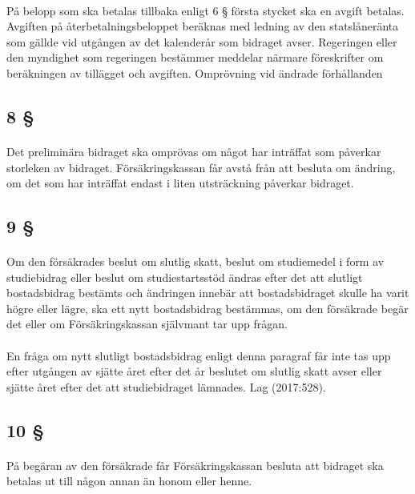 \documentclass[a4paper,notitlepage,openany,10pt]{book}
\begin{document}
\paragraph*{}
På belopp som ska betalas tillbaka enligt 6 § första stycket ska en avgift betalas. Avgiften på återbetalningsbeloppet beräknas med ledning av den statslåneränta som gällde vid utgången av det kalenderår som bidraget avser.
Regeringen eller den myndighet som regeringen bestämmer meddelar närmare föreskrifter om beräkningen av tillägget och avgiften.
Omprövning vid ändrade förhållanden
\subsection*{8 §}
\paragraph*{}
Det preliminära bidraget ska omprövas om något har inträffat som påverkar storleken av bidraget.
Försäkringskassan får avstå från att besluta om ändring, om det som har inträffat endast i liten utsträckning påverkar bidraget.
\subsection*{9 §}
\paragraph*{}
Om den försäkrades beslut om slutlig skatt, beslut om studiemedel i form av studiebidrag eller beslut om studiestartsstöd ändras efter det att slutligt bostadsbidrag bestämts och ändringen innebär att bostadsbidraget skulle ha varit högre eller lägre, ska ett nytt bostadsbidrag bestämmas, om den försäkrade begär det eller om Försäkringskassan självmant tar upp frågan.
\paragraph*{}
En fråga om nytt slutligt bostadsbidrag enligt denna paragraf får inte tas upp efter utgången av sjätte året efter det år beslutet om slutlig skatt avser eller sjätte året efter det att studiebidraget lämnades.
Lag (2017:528).
\subsection*{10 §}
\paragraph*{}
På begäran av den försäkrade får Försäkringskassan besluta att bidraget ska betalas ut till någon annan än honom eller henne.
\end{document}
